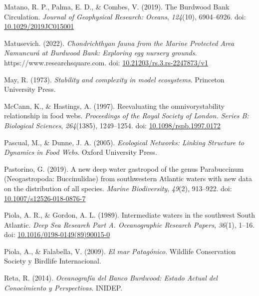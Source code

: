 \documentclass[preprint, 3p,
authoryear]{elsarticle} %
\newlength{\cslhangindent}
\newlength{\cslentryspacingunit} %
\newenvironment{CSLReferences}[2] %
 {%
  \setlength{\parindent}{0pt}
  \ifodd #1
  \let\oldpar\par
  \def\par{\hangindent=\cslhangindent\oldpar}
  \fi
  \setlength{\parskip}{#2\cslentryspacingunit}
 }%
 {}
\begin{document}
\begin{CSLReferences}{1}{0}
\leavevmode{}%
Matano, R. P., Palma, E. D., \& Combes, V. (2019). The {Burdwood Bank
Circulation}. \emph{Journal of Geophysical Research: Oceans},
\emph{124}(10), 6904--6926. doi:
\href{https://doi.org/10.1029/2019JC015001}{10.1029/2019JC015001}

\leavevmode{}%
Matusevich. (2022). \emph{Chondrichthyan fauna from the {Marine
Protected Area Namuncurá} at {Burdwood Bank}: Exploring egg nursery
grounds}. https://www.researchsquare.com. doi:
\href{https://doi.org/10.21203/rs.3.rs-2247873/v1}{10.21203/rs.3.rs-2247873/v1}

\leavevmode{}%
May, R. (1973). \emph{Stability and complexity in model ecosystems}.
{Princeton University Press}.

\leavevmode{}%
McCann, K., \& Hastings, A. (1997). Re\textendash evaluating the
omnivory\textendash stability relationship in food webs.
\emph{Proceedings of the Royal Society of London. Series B: Biological
Sciences}, \emph{264}(1385), 1249--1254. doi:
\href{https://doi.org/10.1098/rspb.1997.0172}{10.1098/rspb.1997.0172}

\leavevmode{}%
Pascual, M., \& Dunne, J. A. (2005). \emph{Ecological {Networks}:
{Linking Structure} to {Dynamics} in {Food Webs}}. {Oxford University
Press}.

\leavevmode{}%
Pastorino, G. (2019). A new deep water gastropod of the genus
{Parabuccinum} ({Neogastropoda}: {Buccinulidae}) from southwestern
{Atlantic} waters with new data on the distribution of all species.
\emph{Marine Biodiversity}, \emph{49}(2), 913--922. doi:
\href{https://doi.org/10.1007/s12526-018-0876-7}{10.1007/s12526-018-0876-7}

\leavevmode{}%
Piola, A. R., \& Gordon, A. L. (1989). Intermediate waters in the
southwest {South Atlantic}. \emph{Deep Sea Research Part A.
Oceanographic Research Papers}, \emph{36}(1), 1--16. doi:
\href{https://doi.org/10.1016/0198-0149(89)90015-0}{10.1016/0198-0149(89)90015-0}

\leavevmode{}%
Piola, A., \& Falabella, V. (2009). \emph{El mar {Patagónico}}.
{Wildlife Conservation Society y Birdlife Internacional}.

\leavevmode{}%
Reta, R. (2014). \emph{Oceanografía del {Banco Burdwood}: {Estado
Actual} del {Conocimiento} y {Perspectivas}}. {INIDEP}.


\end{CSLReferences}
\end{document}
